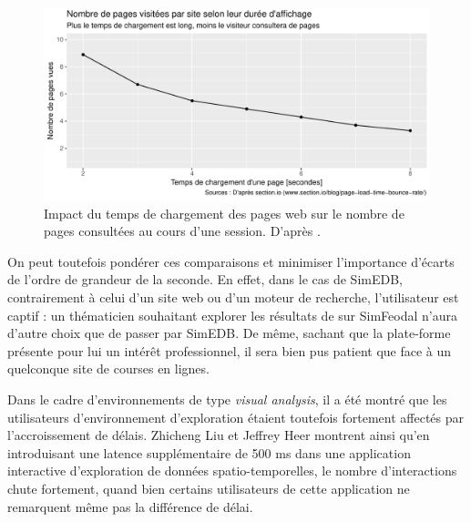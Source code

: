 			\begin{figure}[H]
				\centering
				\includegraphics[width=\linewidth]{img/abandon_pages.pdf}
				\caption{Impact du temps de chargement des pages web sur le nombre de pages consultées au cours d'une session. D'après \cite{elliott_how_2017}.}
				\label{fig:page-abandon}
			\end{figure}
		
			On peut toutefois pondérer ces comparaisons et minimiser l'importance d'écarts de l'ordre de grandeur de la seconde.
			En effet, dans le cas de SimEDB, contrairement à celui d'un site web ou d'un moteur de recherche, l'utilisateur est captif : un thématicien souhaitant explorer les résultats de sur SimFeodal n'aura d'autre choix que de passer par SimEDB.
			De même, sachant que la plate-forme présente pour lui un intérêt professionnel, il sera bien pus patient que face à un quelconque site de courses en lignes.
			
			Dans le cadre d'environnements de type \textit{visual analysis}, il a été montré que les utilisateurs d'environnement d'exploration étaient toutefois fortement affectés par l'accroissement de délais.
			Zhicheng Liu et Jeffrey Heer \autocite{liu_effects_2014} montrent ainsi qu'en introduisant une latence supplémentaire de 500 ms dans une application interactive d'exploration de données spatio-temporelles, le nombre d'interactions chute fortement, quand bien certains utilisateurs de cette application ne remarquent même pas la différence de délai.

			\paragraph*{}
			
